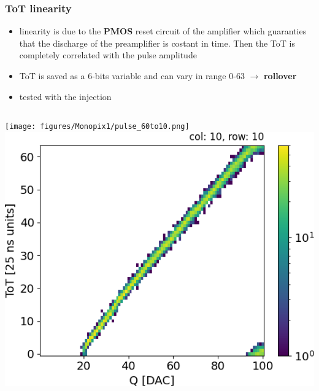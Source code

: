     \begin{frame}
        \frametitle{ToT linearity}
        \begin{itemize}
            \item linearity is due to the \textbf{PMOS} reset circuit of the amplifier which guaranties that the discharge of the preamplifier is costant in time. Then the ToT is completely correlated with the pulse amplitude 
            \item ToT is saved as a 6-bits variable and can vary in range 0-63 $\rightarrow$ \textbf{rollover}
            \item tested with the injection
        \end{itemize}
        \medskip
        \medskip
        \medskip
        \begin{columns}
                \texttt{[image: figures/Monopix1/pulse\_60to10.png]}
                \includegraphics[width=1.2\linewidth]{figures/charaterization/ToT_rollover.png} 

\end{columns}
\end{frame}
